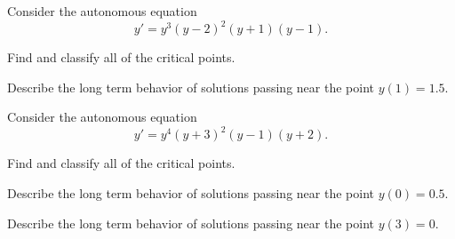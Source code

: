 \begin{applicationActivities}
\begin{activity}{15}
Consider the autonomous equation \[y'=y^3(y-2)^2(y+1)(y-1).\]
\vfill
\begin{subactivity}
Find and classify all of the critical points.
\end{subactivity}
\begin{subactivity}
Describe the long term behavior of solutions passing near the point \(y(1)=1.5\).
\end{subactivity}
\end{activity}

\begin{activity}{15}
Consider the autonomous equation \[y'=y^4(y+3)^2(y-1)(y+2).\]
\vfill

\begin{subactivity}
Find and classify all of the critical points.
\end{subactivity}
\begin{subactivity}
Describe the long term behavior of solutions passing near the point \(y(0)=0.5\).
\end{subactivity}
\begin{subactivity}
Describe the long term behavior of solutions passing near the point \(y(3)=0\).
\end{subactivity}
\end{activity}







\end{applicationActivities}
